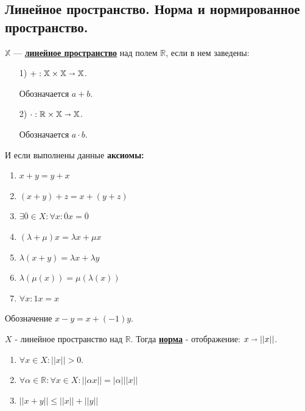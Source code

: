 \documentclass{article}
\newcommand{\deff}[1]{\underline{\textbf{#1}}}
\begin{document}
\subsection{Линейное пространство. Норма и нормированное пространство.}
 $\mathbb{X}$ --- \deff{линейное пространство} над полем $\mathbb{R}$, если в нем заведены:
\begin{enumerate}
    \item[1)] $+:\mathbb{X \times \mathbb{X} \shortrightarrow \mathbb {X}}$.

    Обозначается $a+b$.

    \item[2)] $\cdot: \mathbb{R} \times \mathbb{X} \shortrightarrow \mathbb {X}$.

    Обозначается $a \cdot b$.

\end{enumerate}
И если выполнены данные \textbf{аксиомы:}
\begin{enumerate}
    \item $x+y=y+x$

    \item $(x+y)+z=x+(y+z)$

    \item $\exists \overline{0} \in X: \forall x: \overline{0}x=\overline{0}$

    \item $(\lambda +\mu) x = \lambda x + \mu x$

    \item $\lambda (x+y) = \lambda x + \lambda y$

    \item $\lambda (\mu(x))=\mu(\lambda(x))$

    \item $\forall x: 1x=x$
\end{enumerate}
Обозначение $x-y = x+ (-1)y$.

$X$ - линейное пространство над $\mathbb{R}$. Тогда \deff{норма} - отображение: $x \shortrightarrow ||x||$.

\begin{enumerate}
    \item $\forall x \in X: ||x||>0$.

    \item $ \forall \alpha \in \mathbb{R}: \forall x \in X: ||\alpha x||=|\alpha|||x||  $

    \item $||x+y||\leq||x|| + ||y||$
\end{enumerate}
\end{document}
